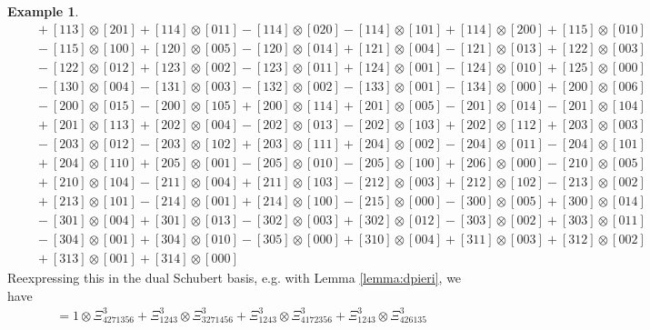 \documentclass{amsart}
\theoremstyle{definition}
\newtheorem{example}[lemma]{Example}
\theoremstyle{remark}
\numberwithin{equation}{subsection}
\begin{document}
\begin{example}
\begin{align*}
&\quad + [113] \otimes [201] + [114] \otimes [011] - [114] \otimes [020] - [114] \otimes [101] + [114] \otimes [200] + [115] \otimes [010] \\
&\quad - [115] \otimes [100] + [120] \otimes [005] - [120] \otimes [014] + [121] \otimes [004] - [121] \otimes [013] + [122] \otimes [003] \\
&\quad - [122] \otimes [012] + [123] \otimes [002] - [123] \otimes [011] + [124] \otimes [001] - [124] \otimes [010] + [125] \otimes [000] \\
&\quad - [130] \otimes [004] - [131] \otimes [003] - [132] \otimes [002] - [133] \otimes [001] - [134] \otimes [000] + [200] \otimes [006] \\
&\quad - [200] \otimes [015] - [200] \otimes [105] + [200] \otimes [114] + [201] \otimes [005] - [201] \otimes [014] - [201] \otimes [104] \\
&\quad + [201] \otimes [113] + [202] \otimes [004] - [202] \otimes [013] - [202] \otimes [103] + [202] \otimes [112] + [203] \otimes [003] \\
&\quad - [203] \otimes [012] - [203] \otimes [102] + [203] \otimes [111] + [204] \otimes [002] - [204] \otimes [011] - [204] \otimes [101] \\
&\quad + [204] \otimes [110] + [205] \otimes [001] - [205] \otimes [010] - [205] \otimes [100] + [206] \otimes [000] - [210] \otimes [005] \\
&\quad + [210] \otimes [104] - [211] \otimes [004] + [211] \otimes [103] - [212] \otimes [003] + [212] \otimes [102] - [213] \otimes [002] \\
&\quad + [213] \otimes [101] - [214] \otimes [001] + [214] \otimes [100] - [215] \otimes [000] - [300] \otimes [005] + [300] \otimes [014] \\
&\quad - [301] \otimes [004] + [301] \otimes [013] - [302] \otimes [003] + [302] \otimes [012] - [303] \otimes [002] + [303] \otimes [011] \\
&\quad - [304] \otimes [001] + [304] \otimes [010] - [305] \otimes [000] + [310] \otimes [004] + [311] \otimes [003] + [312] \otimes [002] \\
&\quad + [313] \otimes [001] + [314] \otimes [000]
\end{align*}
Reexpressing this in the dual Schubert basis, e.g. with Lemma \ref{lemma:dpieri}, we have 
\begin{align*}
&= 1 \otimes \Xi_{4271356}^{3} + \Xi_{1243}^{3} \otimes \Xi_{3271456}^{3} + \Xi_{1243}^{3} \otimes \Xi_{4172356}^{3} + \Xi_{1243}^{3} \otimes \Xi_{426135}^{3} \\

\end{align*}
\end{example}
\end{document}
